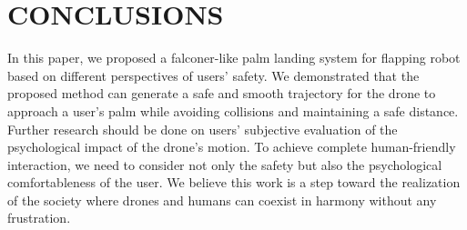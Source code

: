 \section{CONCLUSIONS}

In this paper, we proposed a falconer-like palm landing system for flapping robot based on different perspectives of users' safety.
We demonstrated that the proposed method can generate a safe and smooth trajectory for the drone to approach a user's palm while avoiding collisions and maintaining a safe distance.
Further research should be done on users' subjective evaluation of the psychological impact of the drone's motion.
To achieve complete human-friendly interaction, we need to consider not only the safety but also the psychological comfortableness of the user.
We believe this work is a step toward the realization of the society where drones and humans can coexist in harmony without any frustration.